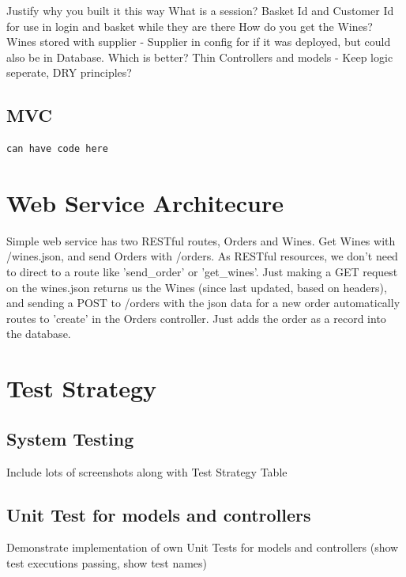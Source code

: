 \documentclass[12pt]{article}
\begin{document}
Justify why you built it this way
What is a session? Basket Id and Customer Id for use in login and basket while they are there
How do you get the Wines?
Wines stored with supplier - Supplier in config for if it was deployed, but could also be in Database. Which is better?
Thin Controllers and models - Keep logic seperate, DRY principles?

\subsection{MVC}
\begin{lstlisting}
can have code here
\end{lstlisting}


\section{Web Service Architecure}

Simple web service has two RESTful routes, Orders and Wines. Get Wines with /wines.json, and send Orders with /orders. As RESTful resources, we don't need to direct to a route like 'send\_order' or 'get\_wines'. Just making a GET request on the wines.json returns us the Wines (since last updated, based on headers), and sending a POST to /orders with the json data for a new order automatically routes to 'create' in the Orders controller. Just adds the order as a record into the database.




\section{Test Strategy}
\subsection{System Testing}
Include lots of screenshots along with Test Strategy Table
\subsection{Unit Test for models and controllers}
Demonstrate implementation of own Unit Tests for models and controllers (show test executions passing, show test names)
\end{document}
